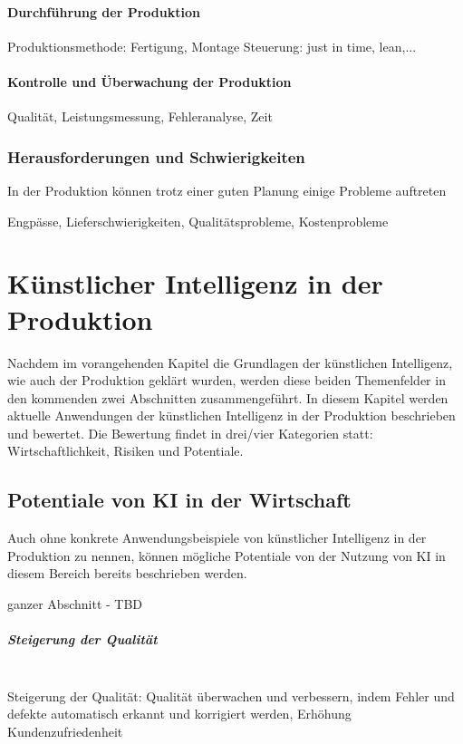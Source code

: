 \documentclass[a4paper,12pt, german]{report}
\begin{document}
\subsubsection{Durchführung der Produktion}
Produktionsmethode: Fertigung, Montage
Steuerung: just in time, lean,...

\subsubsection{Kontrolle und Überwachung der Produktion}

Qualität, Leistungsmessung, Fehleranalyse, Zeit

\subsection{Herausforderungen und Schwierigkeiten}
In der Produktion können trotz einer guten Planung einige Probleme auftreten

Engpässe, Lieferschwierigkeiten, Qualitätsprobleme, Kostenprobleme


\chapter{Künstlicher Intelligenz in der Produktion}

Nachdem im vorangehenden Kapitel die Grundlagen der künstlichen Intelligenz, wie auch der Produktion geklärt wurden, werden diese beiden Themenfelder in den kommenden zwei Abschnitten zusammengeführt. In diesem Kapitel werden aktuelle Anwendungen der künstlichen Intelligenz in der Produktion beschrieben und bewertet. Die Bewertung findet in drei/vier Kategorien statt: Wirtschaftlichkeit, Risiken und Potentiale.

\section{Potentiale von KI in der Wirtschaft}
Auch ohne konkrete Anwendungsbeispiele von künstlicher Intelligenz in der Produktion zu nennen, können mögliche Potentiale von der Nutzung von KI in diesem Bereich bereits beschrieben werden.

ganzer Abschnitt - TBD 

\paragraph{Steigerung der Qualität} $ $ \\ 
Steigerung der Qualität: Qualität überwachen und verbessern, indem Fehler und defekte automatisch erkannt und korrigiert werden, Erhöhung Kundenzufriedenheit
\end{document}
